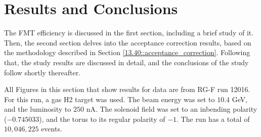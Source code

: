 \section{Results and Conclusions}
\label{14::results_and_conclusions}
    The FMT efficiency is discussed in the first section, including a brief study of it.
    Then, the second section delves into the acceptance correction results, based on the methodology described in Section \ref{13.40::acceptance_correction}.
    Following that, the study results are discussed in detail, and the conclusions of the study follow shortly thereafter.

    All Figures in this section that show results for data are from RG-F run 12016.
    For this run, a gas H2 target was used.
    The beam energy was set to $10.4$ GeV, and the luminosity to $250$ nA.
    The solenoid field was set to an inbending polarity ($-0.745033$), and the torus to its regular polarity of $-1$.
    The run has a total of $10,046,225$ events.

    
    
    
    
    
